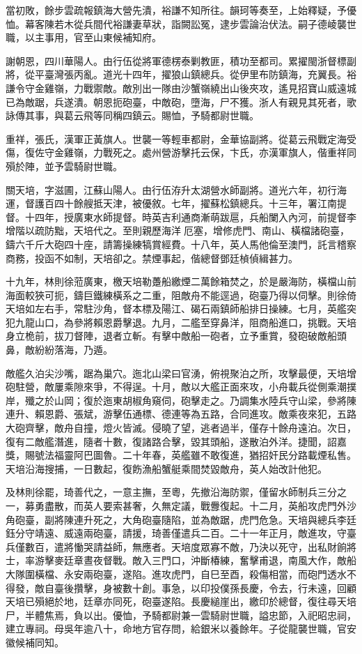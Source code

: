 \begin{pinyinscope}
當初敗，餘步雲疏報鎮海大營先潰，裕謙不知所往。韻珂等奏至，上始釋疑，予優恤。幕客陳若木從兵間代裕謙妻草狀，詣闕訟冤，逮步雲論治伏法。嗣子德崚襲世職，以主事用，官至山東候補知府。

謝朝恩，四川華陽人。由行伍從將軍德楞泰剿教匪，積功至都司。累擢閩浙督標副將，從平臺灣張丙亂。道光十四年，擢狼山鎮總兵。從伊里布防鎮海，充翼長。裕謙令守金雞嶺，力戰禦敵。敵別出一隊由沙蟹嶺繞出山後夾攻，遙見招寶山威遠城已為敵踞，兵遂潰。朝恩扼砲臺，中敵砲，墮海，尸不獲。浙人有親見其死者，歌詠傳其事，與葛云飛等同稱四鎮云。賜恤，予騎都尉世職。

重祥，張氏，漢軍正黃旗人。世襲一等輕車都尉，金華協副將。從葛云飛戰定海受傷，復佐守金雞嶺，力戰死之。處州營游擊托云保，卞氏，亦漢軍旗人，偕重祥同殞於陣，並予雲騎尉世職。

關天培，字滋圃，江蘇山陽人。由行伍洊升太湖營水師副將。道光六年，初行海運，督護百四十餘艘抵天津，被優敘。七年，擢蘇松鎮總兵。十三年，署江南提督。十四年，授廣東水師提督。時英吉利通商漸萌跋扈，兵船闌入內河，前提督李增階以疏防黜，天培代之。至則親歷海洋厄塞，增修虎門、南山、橫檔諸砲臺，鑄六千斤大砲四十座，請籌操練犒賞經費。十八年，英人馬他倫至澳門，託言稽察商務，投函不如制，天培卻之。禁煙事起，偕總督鄧廷楨偵緝甚力。

十九年，林則徐蒞廣東，檄天培勒躉船繳煙二萬餘箱焚之，於是嚴海防，橫檔山前海面較狹可扼，鑄巨鐵練橫系之二重，阻敵舟不能逕過，砲臺乃得以伺擊。則徐倚天培如左右手，常駐沙角，督本標及陽江、碣石兩鎮師船排日操練。七月，英艦突犯九龍山口，為參將賴恩爵擊退。九月，二艦至穿鼻洋，阻商船進口，挑戰。天培身立桅前，拔刀督陣，退者立斬。有擊中敵船一砲者，立予重賞，發砲破敵船頭鼻，敵紛紛落海，乃遁。

敵艦久泊尖沙嘴，踞為巢穴。迤北山梁曰官湧，俯視聚泊之所，攻擊最便，天培增砲駐營，敵屢乘隙來爭，不得逞。十月，敵以大艦正面來攻，小舟載兵從側乘潮撲岸，殲之於山岡；復於迤東胡椒角窺伺，砲擊走之。乃調集水陸兵守山梁，參將陳連升、賴恩爵、張斌，游擊伍通標、德連等為五路，合同進攻。敵乘夜來犯，五路大砲齊擊，敵舟自撞，燈火皆滅。侵曉了望，逃者過半，僅存十餘舟遠泊。次日，復有二敵艦潛進，隨者十數，復諸路合擊，毀其頭船，遂散泊外洋。捷聞，詔嘉獎，賜號法福靈阿巴圖魯。二十年春，英艦雖不敢復進，猶招奸民分路載煙私售。天培沿海搜捕，一日數起，復飭漁船蟹艇乘間焚毀敵舟，英人始改計他犯。

及林則徐罷，琦善代之，一意主撫，至粵，先撤沿海防禦，僅留水師制兵三分之一，募勇盡散，而英人要索甚奢，久無定議，戰釁復起。十二月，英船攻虎門外沙角砲臺，副將陳連升死之，大角砲臺隨陷，並為敵踞，虎門危急。天培與總兵李廷鈺分守靖遠、威遠兩砲臺，請援，琦善僅遣兵二百。二十一年正月，敵進攻，守臺兵僅數百，遣將慟哭請益師，無應者。天培度眾寡不敵，乃決以死守，出私財餉將士，率游擊麥廷章晝夜督戰。敵入三門口，沖斷椿練，奮擊甫退，南風大作，敵船大隊圍橫檔、永安兩砲臺，遂陷。進攻虎門，自巳至酉，殺傷相當，而砲門透水不得發，敵自臺後攢擊，身被數十創。事急，以印投僕孫長慶，令去，行未遠，回顧天培已殞絕於地，廷章亦同死，砲臺遂陷。長慶縋崖出，繳印於總督，復往尋天培尸，半體焦焉，負以出。優恤，予騎都尉兼一雲騎尉世職，謚忠節，入祀昭忠祠，建立專祠。母吳年逾八十，命地方官存問，給銀米以養餘年。子從龍襲世職，官安徽候補同知。


\end{pinyinscope}
